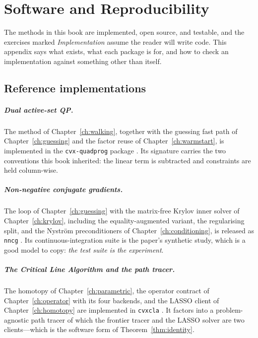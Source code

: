 \chapter{Software and Reproducibility}
\label{app:software}

The methods in this book are implemented, open source, and testable, and the exercises
marked \emph{Implementation} assume the reader will write code. This appendix says what
exists, what each package is for, and how to check an implementation against something
other than itself.

\section{Reference implementations}

\paragraph{Dual active-set QP.} The method of Chapter~\ref{ch:walking}, together with
the guessing fast path of Chapter~\ref{ch:guessing} and the factor reuse of
Chapter~\ref{ch:warmstart}, is implemented in the \texttt{cvx-quadprog} package
\cite{cvxquadprog}. Its signature carries the two conventions this book inherited: the
linear term is subtracted and constraints are held column-wise.

\paragraph{Non-negative conjugate gradients.} The loop of Chapter~\ref{ch:guessing} with
the matrix-free Krylov inner solver of Chapter~\ref{ch:krylov}, including the
equality-augmented variant, the regularising split, and the Nyström preconditioners of
Chapter~\ref{ch:conditioning}, is released as \texttt{nncg}
\cite{schmelzer2026nncg}. Its continuous-integration suite is the paper's synthetic
study, which is a good model to copy: \emph{the test suite is the experiment}.

\paragraph{The Critical Line Algorithm and the path tracer.} The homotopy of
Chapter~\ref{ch:parametric}, the operator contract of Chapter~\ref{ch:operator} with its
four backends, and the LASSO client of Chapter~\ref{ch:homotopy} are implemented in
\texttt{cvxcla} \cite{cvxcla}. It factors into a problem-agnostic path tracer of which
the frontier tracer and the LASSO solver are two clients---which is the software form of
Theorem~\ref{thm:identity}.

